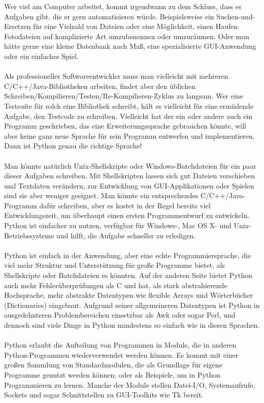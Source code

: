 Wer viel am Computer arbeitet, kommt irgendwann zu dem Schluss, dass es Aufgaben gibt, die er gern automatisieren würde. Beispielsweise ein Suchen-und-Ersetzen für eine Vielzahl von Dateien oder eine Möglichkeit, einen Haufen Fotodateien auf komplizierte Art umzubenennen oder umzuräumen. Oder man hätte gerne eine kleine Datenbank nach Maß, eine spezialisierte GUI-Anwendung oder ein einfaches Spiel.\\
\\
Als professioneller Softwareentwickler muss man vielleicht mit mehreren C/C++/Java-Bibliotheken arbeiten, findet aber den üblichen Schreiben/Kompilieren/Testen/Re-Kompilieren-Zyklus zu langsam. Wer eine Testsuite für solch eine Bibliothek schreibt, hält es vielleicht für eine ermüdende Aufgabe, den Testcode zu schreiben. Vielleicht hat der ein oder andere auch ein Programm geschrieben, das eine Erweiterungssprache gebrauchen könnte, will aber keine ganz neue Sprache für sein Programm entwerfen und implementieren. Dann ist Python genau die richtige Sprache!\\
\\
Man könnte natürlich Unix-Shellskripte oder Windows-Batchdateien für ein paar dieser Aufgaben schreiben. Mit Shellskripten lassen sich gut Dateien verschieben und Textdaten verändern, zur Entwicklung von GUI-Applikationen oder Spielen sind sie aber weniger geeignet. Man könnte ein entsprechendes C/C++/Java-Programm dafür schreiben, aber es kostet in der Regel bereits viel Entwicklungszeit, um überhaupt einen ersten Programmentwurf zu entwickeln. Python ist einfacher zu nutzen, verfügbar für Windows-, Mac OS X- und Unix-Betriebssysteme und hilft, die Aufgabe schneller zu erledigen.\\
\\
Python ist einfach in der Anwendung, aber eine echte Programmiersprache, die viel mehr Struktur und Unterstützung für große Programme bietet, als Shellskripte oder Batchdateien es könnten. Auf der anderen Seite bietet Python auch mehr Fehlerüberprüfungen als C und hat, als stark abstrahierende Hochsprache, mehr abstrakte Datentypen wie flexible Arrays und Wörterbücher (Dictionaries) eingebaut. Aufgrund seiner allgemeineren Datentypen ist Python in ausgedehnteren Problembereichen einsetzbar als Awk oder sogar Perl, und dennoch sind viele Dinge in Python mindestens so einfach wie in diesen Sprachen.\\
\\
Python erlaubt die Aufteilung von Programmen in Module, die in anderen Python-Programmen wiederverwendet werden können. Es kommt mit einer großen Sammlung von Standardmodulen, die als Grundlage für eigene Programme genutzt werden können; oder als Beispiele, um in Python Programmieren zu lernen. Manche der Module stellen Datei-I/O, Systemaufrufe, Sockets und sogar Schnittstellen zu GUI-Toolkits wie Tk bereit.\\
